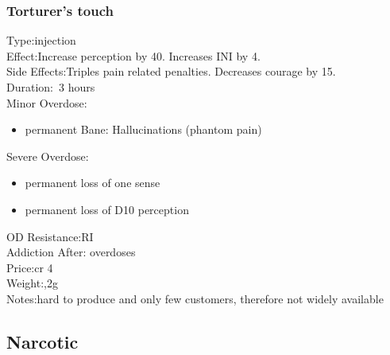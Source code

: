 \subsubsection{Torturer's touch}
Type:\tab injection\\
Effect:\tab Increase perception by 40. Increases INI by 4.\\
Side Effects:\tab Triples pain related penalties. Decreases courage by 15.\\
Duration:\tab ~3 hours\\
Minor Overdose:\\
\begin{itemize}
	\setlength\itemsep{-8mm}
	\vspace{-12mm}
	\item permanent Bane: Hallucinations (phantom pain)
\end{itemize}
Severe Overdose:\\
\begin{itemize}
	\setlength\itemsep{-8mm}
	\vspace{-12mm}
	\item permanent loss of one sense
	\item permanent loss of D10 perception
\end{itemize}
OD Resistance:\tab RI\\
Addiction After: overdoses\\
Price:\tab cr 4\\
Weight:,2g\\
Notes:\tab hard to produce and only few customers, therefore not widely available


\subsection{Narcotic}
